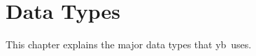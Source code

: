 
\chapter{Data Types}
\label{cha:ptypes}

This chapter explains the major data types that yb\ uses.









